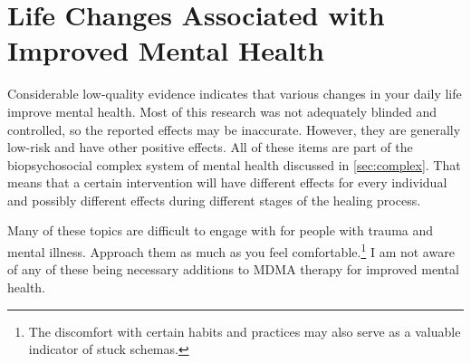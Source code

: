 \documentclass[11pt,oneside]{book}
\begin{document}
\section{Life Changes Associated with Improved Mental Health}
\label{sec:lifechanges}
Considerable low-quality evidence indicates that various changes in your daily life improve mental health. Most of this research was not adequately blinded and controlled, so the reported effects may be inaccurate. However, they are generally low-risk and have other positive effects. All of these items are part of the biopsychosocial complex system of mental health discussed in \cref{sec:complex}. That means that a certain intervention will have different effects for every individual and possibly different effects during different stages of the healing process.

Many of these topics are difficult to engage with for people with trauma and mental illness. Approach them as much as you feel comfortable.\footnote{The discomfort with certain habits and practices may also serve as a valuable indicator of stuck schemas.} I am not aware of any of these being necessary additions to MDMA therapy for improved mental health.
\end{document}
